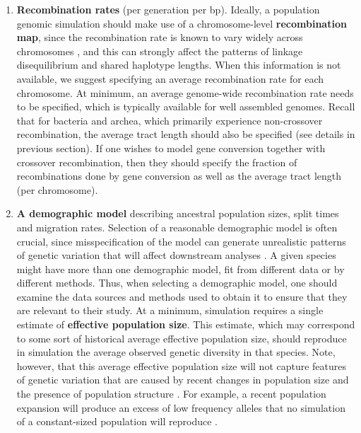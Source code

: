 \documentclass[hidelinks]{article}
\begin{document}
\begin{enumerate}
\item
  \textbf{Recombination rates} (per generation per bp).
  Ideally, a population genomic simulation should make use of a chromosome-level \textbf{recombination map}, 
  since the recombination rate is known to vary widely across chromosomes \citep{Nachman2002},
  and this can strongly affect the patterns of linkage disequilibrium and shared haplotype lengths.
  When this information is not available, we suggest specifying an average recombination rate for each chromosome.
  At minimum, an average genome-wide recombination rate needs to be specified, which is typically available for well assembled genomes.
  Recall that for bacteria and archea, which primarily experience non-crossover recombination,
  the average tract length should also be specified
  (see details in previous section).
  If one wishes to model gene conversion together with crossover recombination,
  then they should specify the fraction of recombinations done by gene conversion
  as well as the average tract length (per chromosome).

\item
  \textbf{A demographic model} describing 
  ancestral population sizes, split times and migration rates.
  Selection of a reasonable demographic model is often crucial,
  since misspecification of the model can generate unrealistic patterns of genetic variation that will affect downstream analyses \citep[e.g.,][]{Navascues2009}.
  A given species might have more than one demographic model, fit from different data or by different methods.
  Thus, when selecting a demographic model, one should examine the data sources and methods used to obtain it to ensure that they are relevant to their study.
  At a minimum, simulation requires a single estimate of \textbf{effective population size}. This estimate, which may correspond to some sort of historical average effective population size,
  should reproduce in simulation the average observed genetic diversity in that species. Note, however, that this average effective population size will not capture features of genetic variation that are caused by recent changes in population size and the presence of population structure \citep{MacLeod2013,Eldon2015}.
  For example, a recent population expansion will produce
  an excess of low frequency alleles that no simulation of a constant-sized
  population will reproduce \citep{Tennessen2012}.


\end{enumerate}
\end{document}
